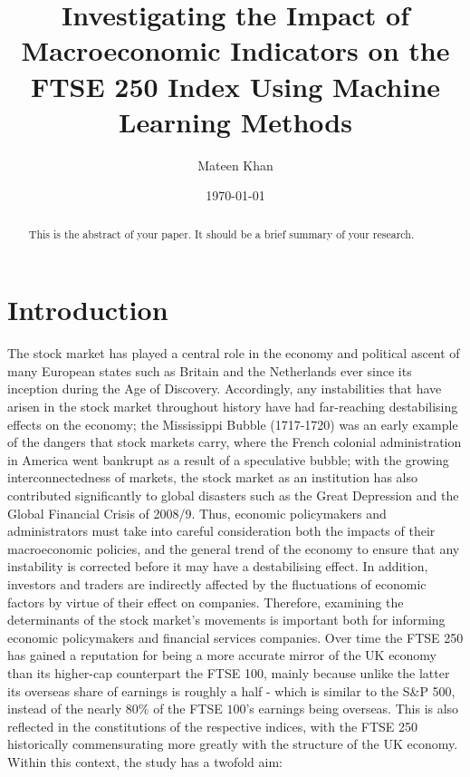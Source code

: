 \documentclass[12pt,a4paper]{article}
\title{Investigating the Impact of Macroeconomic Indicators 
on the FTSE 250 Index Using Machine Learning Methods}
\author{Mateen Khan}
\date{\today}
\begin{document}
\maketitle

\begin{abstract}
    This is the abstract of your paper. It should be a brief summary of your research.
\end{abstract}

\section{Introduction}

The stock market has played a central role in the economy and political ascent of many European states such as Britain and the Netherlands ever since its inception during the Age of Discovery. Accordingly, any instabilities that have arisen in the stock market throughout history have had far-reaching destabilising effects on the economy; the Mississippi Bubble (1717-1720) was an early example of the dangers that stock markets carry, where the French colonial administration in America went bankrupt as a result of a speculative bubble; with the growing interconnectedness of markets, the stock market as an institution has also contributed significantly to global disasters such as the Great Depression and the Global Financial Crisis of 2008/9. Thus, economic policymakers and administrators must take into careful consideration both the impacts of their macroeconomic policies, and the general trend of the economy to ensure that any instability is corrected before it may have a destabilising effect. In addition, investors and traders are indirectly affected by the fluctuations of economic factors by virtue of their effect on companies. Therefore, examining the determinants of the stock market’s movements is important both for informing economic policymakers and financial services companies. Over time the FTSE 250 has gained a reputation for being a more accurate mirror of the UK economy than its higher-cap counterpart the FTSE 100, mainly because unlike the latter its overseas share of earnings is roughly a half - which is similar to the S\&P 500, instead of the nearly $80\%$ of the FTSE $100$'s earnings being overseas. This is also reflected in the constitutions of the respective indices, with the FTSE 250 historically commensurating more greatly with the structure of the UK economy. Within this context, the study has a twofold aim:
\end{document}
